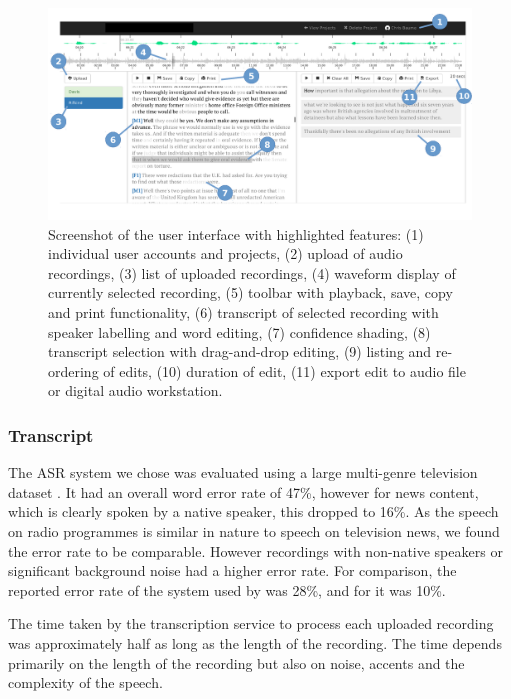 \begin{figure}[ht]
\centering
  \includegraphics[width=\columnwidth]{figs/interface-labels.pdf}
  \caption{Screenshot of the user interface with highlighted features: (1)
    individual user accounts and projects, (2) upload of audio recordings, (3)
    list of uploaded recordings, (4) waveform display of currently selected
    recording, (5) toolbar with playback, save, copy and print functionality,
    (6) transcript of selected recording with speaker labelling and word
    editing, (7) confidence shading, (8) transcript selection with
    drag-and-drop editing, (9) listing and re-ordering of edits, (10) duration
    of edit, (11) export edit to audio file or digital audio workstation.}
  \label{fig:interface}
\end{figure}

\subsubsection{Transcript}\label{sec:transcript}

The ASR system we chose was evaluated using a large multi-genre television dataset \citep{Bell2015}.  It had an overall
word error rate of 47\%, however for news content, which is clearly spoken by a native speaker, this dropped to 16\%.
As the speech on radio programmes is similar in nature to speech on television news, we found the error rate to be
comparable. However recordings with non-native speakers or significant background noise had a higher error rate.  For
comparison, the reported error rate of the system used by \citet{Whittaker2004} was 28\%, and for \citet{Sivaraman2016}
it was 10\%.

The time taken by the transcription service to process each uploaded recording was approximately half as long as the
length of the recording. The time depends primarily on the length of the recording but also on noise, accents and the
complexity of the speech.

